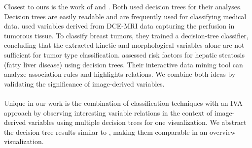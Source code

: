 \documentclass[a4paper,twoside]{style/article}
\begin{document}
Closest to ours is the work of \cite{Glasser2013} and \cite{Niemann2014}.
Both used decision trees for their analyses.
Decision trees are easily readable and are frequently used for classifying medical data.
\cite{Glasser2013} used variables derived from DCE-MRI data capturing the perfusion in tumorous tissue.
To classify breast tumors, they trained a decision-tree classifier, concluding that the extracted kinetic and morphological variables alone are not sufficient for tumor type classification.
\cite{Niemann2014} assessed risk factors for hepatic steatosis (fatty liver disease) using decision trees.
Their interactive data mining tool can analyze association rules and highlights relations.
We combine both ideas by validating the significance of image-derived variables.
\\\\
Unique in our work is the combination of classification techniques with an IVA approach by observing interesting variable relations in the context of image-derived variables using multiple decision trees for one visualization.
We abstract the decision tree results similar to \cite{Turkay}, making them comparable in an overview visualization.
\end{document}
